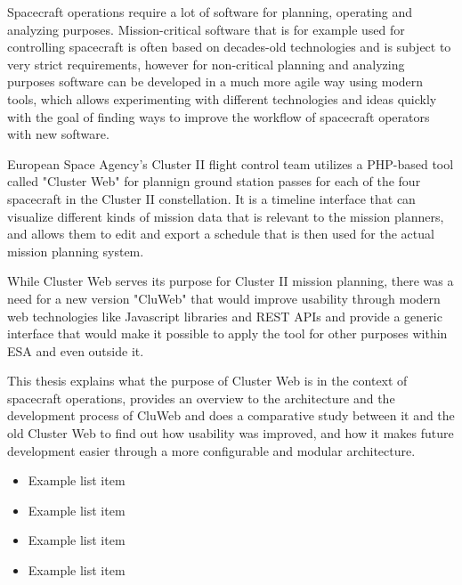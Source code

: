 Spacecraft operations require a lot of software for planning, operating and analyzing purposes. Mission-critical software that is for example used for controlling spacecraft is often based on decades-old technologies and is subject to very strict requirements, however for non-critical planning and analyzing purposes software can be developed in a much more agile way using modern tools, which allows experimenting with different technologies and ideas quickly with the goal of finding ways to improve the workflow of spacecraft operators with new software.

European Space Agency's Cluster II flight control team utilizes a PHP-based tool called "Cluster Web" for plannign ground station passes for each of the four spacecraft in the Cluster II constellation. It is a timeline interface that can visualize different kinds of mission data that is relevant to the mission planners, and allows them to edit and export a schedule that is then used for the actual mission planning system.

While Cluster Web serves its purpose for Cluster II mission planning, there was a need for a new version "CluWeb" that would improve usability through modern web technologies like Javascript libraries and REST APIs and provide a generic interface that would make it possible to apply the tool for other purposes within ESA and even outside it.

This thesis explains what the purpose of Cluster Web is in the context of spacecraft operations, provides an overview to the architecture and the development process of CluWeb and does a comparative study between it and the old Cluster Web to find out how usability was improved, and how it makes future development easier through a more configurable and modular architecture. \cite{kamara, al-shaer}


\begin{itemize}
\item Example list item
\item Example list item
\item Example list item
\item Example list item
\end{itemize}



